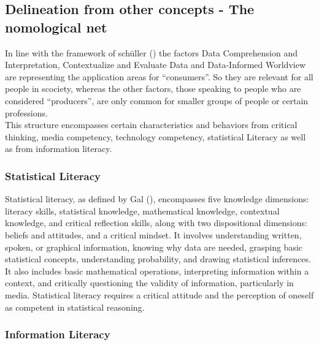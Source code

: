 \documentclass[
  12pt,
  a4paper,
  twoside]{article}
\begin{document}
\subsection{Delineation from other concepts - The nomological
net}\label{delineation-from-other-concepts---the-nomological-net}

In line with the framework of schüller
() the factors Data Comprehension
and Interpretation, Contextualize and Evaluate Data and Data-Informed
Worldview are representing the application areas for ``consumers''. So
they are relevant for all people in scociety, whereas the other factors,
those speaking to people who are considered ``producers'', are only
common for smaller groups of people or certain professions.\\
This structure encompasses certain characteristics and behaviors from
critical thinking, media competency, technology competency, statistical
Literacy as well as from information literacy.

\subsubsection{Statistical Literacy}\label{statistical-literacy}

Statistical literacy, as defined by Gal (),
encompasses five knowledge dimensions: literacy skills, statistical
knowledge, mathematical knowledge, contextual knowledge, and critical
reflection skills, along with two dispositional dimensions: beliefs and
attitudes, and a critical mindset. It involves understanding written,
spoken, or graphical information, knowing why data are needed, grasping
basic statistical concepts, understanding probability, and drawing
statistical inferences. It also includes basic mathematical operations,
interpreting information within a context, and critically questioning
the validity of information, particularly in media. Statistical literacy
requires a critical attitude and the perception of oneself as competent
in statistical reasoning.

\subsubsection{Information Literacy}\label{information-literacy}
\end{document}
